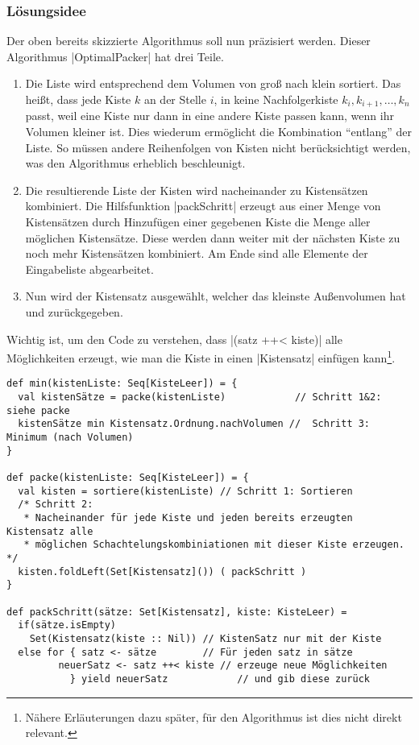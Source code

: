 \subsubsection{Lösungsidee}
\lstset{basicstyle=\ttfamily}
 Der oben bereits skizzierte Algorithmus soll nun präzisiert werden.
 Dieser Algorithmus |OptimalPacker| hat drei Teile.
\begin{enumerate}
 \item Die Liste wird entsprechend dem Volumen von groß nach klein sortiert.
  Das heißt, dass jede Kiste $k$ an der Stelle $i$, in keine Nachfolgerkiste $k_i, k_{i+1}, \dots, k_n$ passt,
   weil eine Kiste nur dann in eine andere Kiste passen kann, wenn ihr Volumen kleiner ist.
  Dies wiederum ermöglicht die Kombination ``entlang'' der Liste.
  So müssen andere Reihenfolgen von Kisten nicht berücksichtigt werden, was den Algorithmus erheblich beschleunigt.
 \item Die resultierende Liste der Kisten wird nacheinander zu Kistensätzen kombiniert.
  Die Hilfsfunktion |packSchritt| erzeugt aus einer Menge von Kistensätzen durch Hinzufügen einer gegebenen Kiste die Menge aller möglichen Kistensätze.
  Diese werden dann weiter mit der nächsten Kiste zu noch mehr Kistensätzen kombiniert.
  Am Ende sind alle Elemente der Eingabeliste abgearbeitet.
 \item Nun wird der Kistensatz ausgewählt, welcher das kleinste Außenvolumen hat und zurückgegeben.
\end{enumerate}
 Wichtig ist, um den Code zu verstehen, dass |(satz ++< kiste)| alle Möglichkeiten erzeugt,
 wie man die Kiste in einen |Kistensatz| einfügen kann\footnote{Nähere Erläuterungen dazu später, für den Algorithmus ist dies nicht direkt relevant.}.

\lstset{basicstyle=\ttfamily\small}
\begin{lstlisting}
def min(kistenListe: Seq[KisteLeer]) = {
  val kistenSätze = packe(kistenListe)            // Schritt 1&2: siehe packe
  kistenSätze min Kistensatz.Ordnung.nachVolumen //  Schritt 3: Minimum (nach Volumen)
}

def packe(kistenListe: Seq[KisteLeer]) = {
  val kisten = sortiere(kistenListe) // Schritt 1: Sortieren
  /* Schritt 2:
   * Nacheinander für jede Kiste und jeden bereits erzeugten Kistensatz alle
   * möglichen Schachtelungskombiniationen mit dieser Kiste erzeugen. */
  kisten.foldLeft(Set[Kistensatz]()) ( packSchritt )
}

def packSchritt(sätze: Set[Kistensatz], kiste: KisteLeer) =
  if(sätze.isEmpty)
    Set(Kistensatz(kiste :: Nil)) // KistenSatz nur mit der Kiste
  else for { satz <- sätze 		  // Für jeden satz in sätze
	     neuerSatz <- satz ++< kiste // erzeuge neue Möglichkeiten
           } yield neuerSatz            // und gib diese zurück
\end{lstlisting}
\lstset{basicstyle=\ttfamily}
